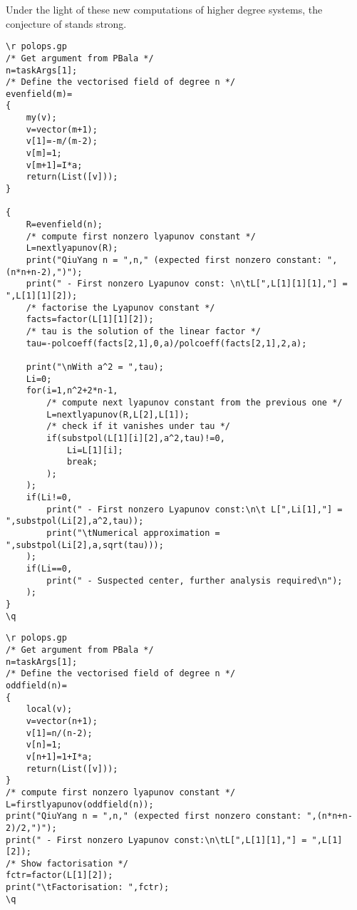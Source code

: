 Under the light of these new computations of higher degree systems, the conjecture of \textcite{Qiu2009} stands strong.

\newpage

\begin{lstlisting}[caption={PARI/GP program that computes the first significant Lyapunov constant of a \emph{Qiu-Yang} even differential equation \parencite{Qiu2009}, and solves it to find the condition for which the order of the focus can be increased.},label={lst.qiuyang.even}]
\r polops.gp
/* Get argument from PBala */
n=taskArgs[1];
/* Define the vectorised field of degree n */
evenfield(m)=
{
    my(v);
    v=vector(m+1);
    v[1]=-m/(m-2);
    v[m]=1;
    v[m+1]=I*a;
    return(List([v]));
}

{
    R=evenfield(n);
    /* compute first nonzero lyapunov constant */
    L=nextlyapunov(R);
    print("QiuYang n = ",n," (expected first nonzero constant: ",(n*n+n-2),")");
    print(" - First nonzero Lyapunov const: \n\tL[",L[1][1][1],"] = ",L[1][1][2]);
    /* factorise the Lyapunov constant */
    facts=factor(L[1][1][2]);
    /* tau is the solution of the linear factor */
    tau=-polcoeff(facts[2,1],0,a)/polcoeff(facts[2,1],2,a);
	 
    print("\nWith a^2 = ",tau);
    Li=0;
    for(i=1,n^2+2*n-1,
        /* compute next lyapunov constant from the previous one */
        L=nextlyapunov(R,L[2],L[1]);
        /* check if it vanishes under tau */
        if(substpol(L[1][i][2],a^2,tau)!=0,
            Li=L[1][i];
            break;
        );
    );   
    if(Li!=0,
        print(" - First nonzero Lyapunov const:\n\t L[",Li[1],"] = ",substpol(Li[2],a^2,tau));
        print("\tNumerical approximation = ",substpol(Li[2],a,sqrt(tau)));
    );
    if(Li==0,
        print(" - Suspected center, further analysis required\n");
    );
}
\q
\end{lstlisting}


\begin{lstlisting}[caption={PARI/GP script that computes the first nonzero Lyapunov constant for the odd cases in Proposition \ref{prop.qiuyang}. This program does not need to solve any equation, since the key point is that the systems have a high order focus \emph{if} the first nonzero Lyapunov constant \emph{cannot} be solved, which only happens for $\tau$ transcendental.},label={lst.qiuyang.odd}]
\r polops.gp
/* Get argument from PBala */
n=taskArgs[1];
/* Define the vectorised field of degree n */
oddfield(n)=
{
    local(v);
    v=vector(n+1);
    v[1]=n/(n-2);
    v[n]=1;
    v[n+1]=1+I*a;
    return(List([v]));
}
/* compute first nonzero lyapunov constant */
L=firstlyapunov(oddfield(n));
print("QiuYang n = ",n," (expected first nonzero constant: ",(n*n+n-2)/2,")");
print(" - First nonzero Lyapunov const:\n\tL[",L[1][1],"] = ",L[1][2]);
/* Show factorisation */
fctr=factor(L[1][2]);
print("\tFactorisation: ",fctr);
\q
\end{lstlisting}

